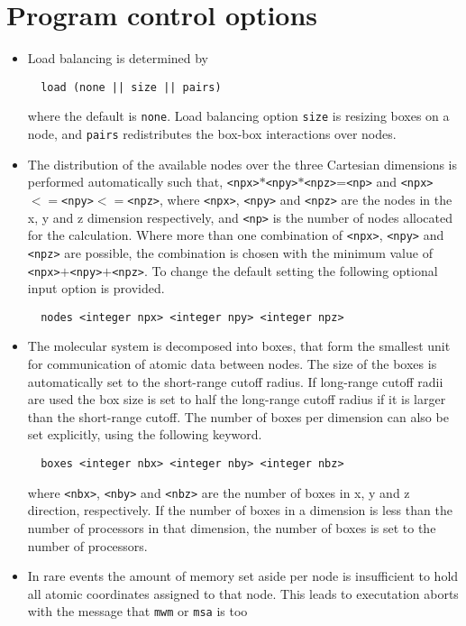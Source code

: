 \section{Program control options}
\begin{itemize}
\item
Load balancing is determined by
\begin{verbatim}
  load (none || size || pairs)
\end{verbatim}
where the default is {\tt none}. Load balancing option {\tt size}
is resizing boxes on a node, and {\tt pairs} redistributes the
box-box interactions over nodes.
\item
The distribution of the available nodes over the three Cartesian
dimensions is performed automatically such that, 
\verb+<npx>+$*$\verb+<npy>+$*$\verb+<npz>+=\verb+<np>+
and \verb+<npx>+$<=$\verb+<npy>+$<=$\verb+<npz>+, 
where \verb+<npx>+, \verb+<npy>+ and \verb+<npz>+ are the nodes in the
x, y and z dimension respectively, and \verb+<np>+ is the number of nodes
allocated for the calculation. Where more than one combination
of \verb+<npx>+, \verb+<npy>+ and \verb+<npz>+ are possible, the 
combination is chosen with the minimum value of 
\verb+<npx>+$+$\verb+<npy>+$+$\verb+<npz>+. To change the default setting
the following optional input option is provided.
\begin{verbatim}
  nodes <integer npx> <integer npy> <integer npz>
\end{verbatim}
\item
The molecular system is decomposed into boxes, that form the smallest
unit for communication of atomic data between nodes. The size of the
boxes is automatically set to the short-range cutoff radius. If
long-range cutoff radii  are used the box size is set to half the
long-range cutoff radius if it is larger than the short-range cutoff.
The number of boxes per dimension can also be set explicitly, using
the following keyword.
\begin{verbatim}
  boxes <integer nbx> <integer nby> <integer nbz>
\end{verbatim}
where \verb+<nbx>+, \verb+<nby>+ and \verb+<nbz>+ are the number of
boxes in x, y and z direction, respectively.
If the number of boxes in a dimension is less than the number of
processors in that dimension, the number of boxes is set to the number
of processors.
\item
In rare events the amount of memory set aside per node is insufficient
to hold all atomic coordinates assigned to that node. This leads to 
executation aborts with the message that {\tt mwm} or {\tt msa} is too

\end{itemize}
